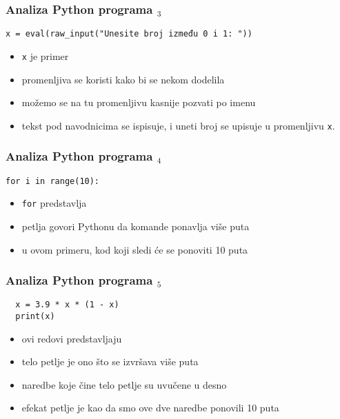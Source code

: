 \documentclass[utf8,compress]{beamer}
\begin{document}
\begin{frame}[fragile]
\frametitle{Analiza Python programa $_3$}
\begin{verbatim}
x = eval(raw_input("Unesite broj između 0 i 1: "))
\end{verbatim}
\begin{itemize}
  \item \texttt{x} je primer 
  \item promenljiva se koristi kako bi se nekom  dodelila 
  \item možemo se na tu promenljivu kasnije pozvati po imenu
  \item tekst pod navodnicima se ispisuje, i uneti broj se upisuje u promenljivu \texttt{x}.
\end{itemize}
\end{frame}

\begin{frame}[fragile]
\frametitle{Analiza Python programa $_4$}
\begin{verbatim}
for i in range(10):
\end{verbatim}
\begin{itemize}
  \item \texttt{for} predstavlja 
  \item petlja govori Pythonu da komande ponavlja više puta
  \item u ovom primeru, kod koji sledi će se ponoviti 10 puta
\end{itemize}
\end{frame}

\begin{frame}[fragile]
\frametitle{Analiza Python programa $_5$}
\begin{verbatim}
  x = 3.9 * x * (1 - x)
  print(x)
\end{verbatim}
\begin{itemize}
  \item ovi redovi predstavljaju 
  \item telo petlje je ono što se izvršava više puta
  \item naredbe koje čine telo petlje su uvučene u desno
  \item efekat petlje je kao da smo ove dve naredbe ponovili 10 puta
\end{itemize}
\end{frame}
\end{document}

